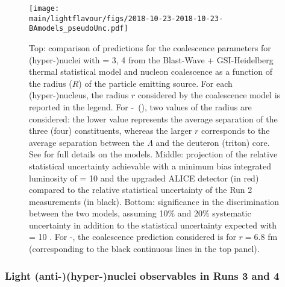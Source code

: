 \begin{figure}[!t]
\begin{center}
\texttt{[image: \\main/lightflavour/figs/2018-10-23-2018-10-23-BAmodels\_pseudoUnc.pdf]}
\end{center}
\caption{
Top: comparison of predictions for the coalescence parameters for (hyper-)nuclei with \Anucl = 3, 4 from the Blast-Wave + GSI-Heidelberg thermal statistical model and nucleon coalescence as a function of the radius ($R$) of the particle emitting source. For each (hyper-)nucleus, the radius $r$ considered by the coalescence model is reported in the legend. For \hyp~(\hypfour), two values of the radius are considered: the lower value represents the average separation of the three (four) constituents, whereas the larger $r$ corresponds to the average separation between the $\Lambda$ and the deuteron (triton) core. See \cite{Bellini:2018epz} for full details on the models. Middle: projection of the relative statistical uncertainty achievable with a minimum bias \PbPb integrated luminosity of \Lint = 10 \nbInv and the upgraded ALICE detector (in red) compared to the relative statistical uncertainty of the Run 2 measurements (in black). Bottom: significance in the discrimination between the two models, assuming 10$\%$ and 20$\%$ systematic uncertainty in addition to the statistical uncertainty expected with \Lint = 10 \nbInv. For \hyp, the coalescence prediction considered is  for $r = 6.8$ fm (corresponding to the black continuous lines in the top panel).}
\label{fig:BAmodels}
\end{figure}

\subsubsection{Light (anti-)(hyper-)nuclei observables in Runs 3 and 4}
\label{sec:hyper}

